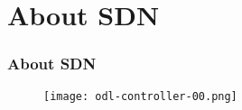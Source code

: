 \section{About SDN}

\begin{frame}[allowframebreaks]
\frametitle{About SDN}

\begin{center}
  \begin{figure}
    \texttt{[image: odl-controller-00.png]}
  \end{figure}
\end{center}

\end{frame}
